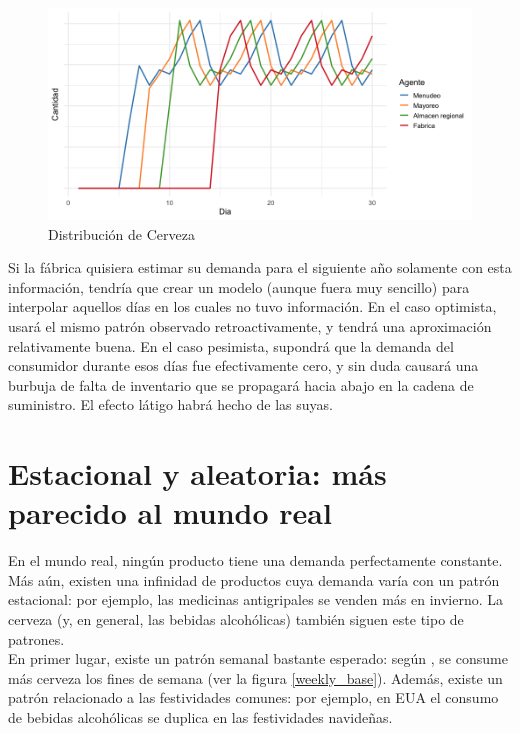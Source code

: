\begin{figure}[ht!]
\caption{Distribuci\'on de Cerveza}
\label{analytic_2}
\includegraphics[width=12cm]{tesis_tex/figs/analytic_solution_0_all_45_inv.png}
\centering
\end{figure}

Si la f\'abrica quisiera estimar su demanda para el siguiente a\~no solamente con esta informaci\'on, tendr\'ia que crear un modelo (aunque fuera muy sencillo) para interpolar aquellos d\'ias en los cuales no tuvo informaci\'on. En el caso optimista, usar\'a el mismo patr\'on observado retroactivamente, y tendr\'a una aproximaci\'on relativamente buena. En el caso pesimista, supondr\'a que la demanda del consumidor durante esos d\'ias fue efectivamente cero, y sin duda causar\'a una burbuja de falta de inventario que se propagar\'a hacia abajo en la cadena de suministro. El efecto l\'atigo habr\'a hecho de las suyas.\\

\section{Estacional y aleatoria: m\'as parecido al mundo real}

En el mundo real, ning\'un producto tiene una demanda perfectamente constante. M\'as a\'un, existen una infinidad de productos cuya demanda var\'ia con un patr\'on estacional: por ejemplo, las medicinas antigripales se venden m\'as en invierno. La cerveza (y, en general, las bebidas alcoh\'olicas) tambi\'en siguen este tipo de patrones.\\

En primer lugar, existe un patr\'on semanal bastante esperado: seg\'un \citet{gallupbeer}, se consume m\'as cerveza los fines de semana (ver la figura \ref{weekly_base}). Adem\'as, existe un patr\'on relacionado a las festividades comunes: por ejemplo, en EUA el consumo de bebidas alcoh\'olicas se duplica en las festividades navide\~nas. \\

